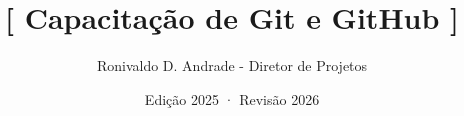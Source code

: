\newcommand{\bloco}[4]{%
\begin{frame}[plain]
  \vfill
  \begin{center}
    {\lexendlight\textcolor{lightpurple}{\Large BLOCO #1}}

    \vspace{0.8em}
    {\fontsize{26}{32}\selectfont\textbf{\textcolor{white}{#2}}}

    \vspace{1.5em}
    \textcolor{lightpurple}{\rule{0.35\linewidth}{2pt}}

    \vspace{1.2em}
    {\lexendsemibold\textcolor{yellow}{\large #3 \quad · \quad #4}}
  \end{center}
  \vfill
\end{frame}}

\ifdefined\COMNOTAS
\fi

\title{{\Huge \textcolor{lightpurple}{\textbf{[}} \textbf{Capacitação de Git e GitHub} \textcolor{lightpurple}{\textbf{]}}}}
\author{{\normalsize Ronivaldo D. Andrade - Diretor de Projetos}}
\date{{\normalsize Edição 2025 · Revisão 2026}}

